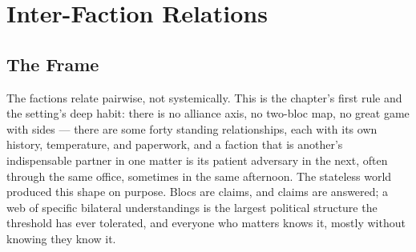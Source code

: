 %
%

\section{Inter-Faction Relations}

\subsection{The Frame}

The factions relate pairwise, not systemically. This is the chapter's first rule and the setting's deep habit: there is no alliance axis, no two-bloc map, no great game with sides --- there are some forty standing relationships, each with its own history, temperature, and paperwork, and a faction that is another's indispensable partner in one matter is its patient adversary in the next, often through the same office, sometimes in the same afternoon. The stateless world produced this shape on purpose. Blocs are claims, and claims are answered; a web of specific bilateral understandings is the largest political structure the threshold has ever tolerated, and everyone who matters knows it, mostly without knowing they know it.

